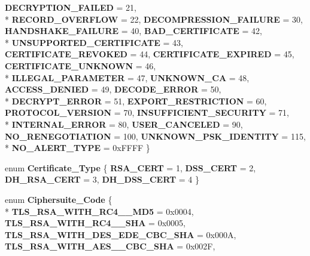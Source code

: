 \begin{DoxyCompactItemize}
{\bfseries D\-E\-C\-R\-Y\-P\-T\-I\-O\-N\-\_\-\-F\-A\-I\-L\-E\-D} = 21, 
\\*
{\bfseries R\-E\-C\-O\-R\-D\-\_\-\-O\-V\-E\-R\-F\-L\-O\-W} = 22, 
{\bfseries D\-E\-C\-O\-M\-P\-R\-E\-S\-S\-I\-O\-N\-\_\-\-F\-A\-I\-L\-U\-R\-E} = 30, 
{\bfseries H\-A\-N\-D\-S\-H\-A\-K\-E\-\_\-\-F\-A\-I\-L\-U\-R\-E} = 40, 
{\bfseries B\-A\-D\-\_\-\-C\-E\-R\-T\-I\-F\-I\-C\-A\-T\-E} = 42, 
\\*
{\bfseries U\-N\-S\-U\-P\-P\-O\-R\-T\-E\-D\-\_\-\-C\-E\-R\-T\-I\-F\-I\-C\-A\-T\-E} = 43, 
{\bfseries C\-E\-R\-T\-I\-F\-I\-C\-A\-T\-E\-\_\-\-R\-E\-V\-O\-K\-E\-D} = 44, 
{\bfseries C\-E\-R\-T\-I\-F\-I\-C\-A\-T\-E\-\_\-\-E\-X\-P\-I\-R\-E\-D} = 45, 
{\bfseries C\-E\-R\-T\-I\-F\-I\-C\-A\-T\-E\-\_\-\-U\-N\-K\-N\-O\-W\-N} = 46, 
\\*
{\bfseries I\-L\-L\-E\-G\-A\-L\-\_\-\-P\-A\-R\-A\-M\-E\-T\-E\-R} = 47, 
{\bfseries U\-N\-K\-N\-O\-W\-N\-\_\-\-C\-A} = 48, 
{\bfseries A\-C\-C\-E\-S\-S\-\_\-\-D\-E\-N\-I\-E\-D} = 49, 
{\bfseries D\-E\-C\-O\-D\-E\-\_\-\-E\-R\-R\-O\-R} = 50, 
\\*
{\bfseries D\-E\-C\-R\-Y\-P\-T\-\_\-\-E\-R\-R\-O\-R} = 51, 
{\bfseries E\-X\-P\-O\-R\-T\-\_\-\-R\-E\-S\-T\-R\-I\-C\-T\-I\-O\-N} = 60, 
{\bfseries P\-R\-O\-T\-O\-C\-O\-L\-\_\-\-V\-E\-R\-S\-I\-O\-N} = 70, 
{\bfseries I\-N\-S\-U\-F\-F\-I\-C\-I\-E\-N\-T\-\_\-\-S\-E\-C\-U\-R\-I\-T\-Y} = 71, 
\\*
{\bfseries I\-N\-T\-E\-R\-N\-A\-L\-\_\-\-E\-R\-R\-O\-R} = 80, 
{\bfseries U\-S\-E\-R\-\_\-\-C\-A\-N\-C\-E\-L\-E\-D} = 90, 
{\bfseries N\-O\-\_\-\-R\-E\-N\-E\-G\-O\-T\-I\-A\-T\-I\-O\-N} = 100, 
{\bfseries U\-N\-K\-N\-O\-W\-N\-\_\-\-P\-S\-K\-\_\-\-I\-D\-E\-N\-T\-I\-T\-Y} = 115, 
\\*
{\bfseries N\-O\-\_\-\-A\-L\-E\-R\-T\-\_\-\-T\-Y\-P\-E} = 0x\-F\-F\-F\-F
 \}
\item 
enum {\bfseries Certificate\-\_\-\-Type} \{ {\bfseries R\-S\-A\-\_\-\-C\-E\-R\-T} = 1, 
{\bfseries D\-S\-S\-\_\-\-C\-E\-R\-T} = 2, 
{\bfseries D\-H\-\_\-\-R\-S\-A\-\_\-\-C\-E\-R\-T} = 3, 
{\bfseries D\-H\-\_\-\-D\-S\-S\-\_\-\-C\-E\-R\-T} = 4
 \}
\item 
enum {\bfseries Ciphersuite\-\_\-\-Code} \{ \\*
{\bfseries T\-L\-S\-\_\-\-R\-S\-A\-\_\-\-W\-I\-T\-H\-\_\-\-R\-C4\-\_\-\_\-\-M\-D5} = 0x0004, 
{\bfseries T\-L\-S\-\_\-\-R\-S\-A\-\_\-\-W\-I\-T\-H\-\_\-\-R\-C4\-\_\-\_\-\-S\-H\-A} = 0x0005, 
{\bfseries T\-L\-S\-\_\-\-R\-S\-A\-\_\-\-W\-I\-T\-H\-\_\-D\-E\-S\-\_\-\-E\-D\-E\-\_\-\-C\-B\-C\-\_\-\-S\-H\-A} = 0x000\-A, 
{\bfseries T\-L\-S\-\_\-\-R\-S\-A\-\_\-\-W\-I\-T\-H\-\_\-\-A\-E\-S\-\_\-\_\-\-C\-B\-C\-\_\-\-S\-H\-A} = 0x002\-F, 

\end{DoxyCompactItemize}
